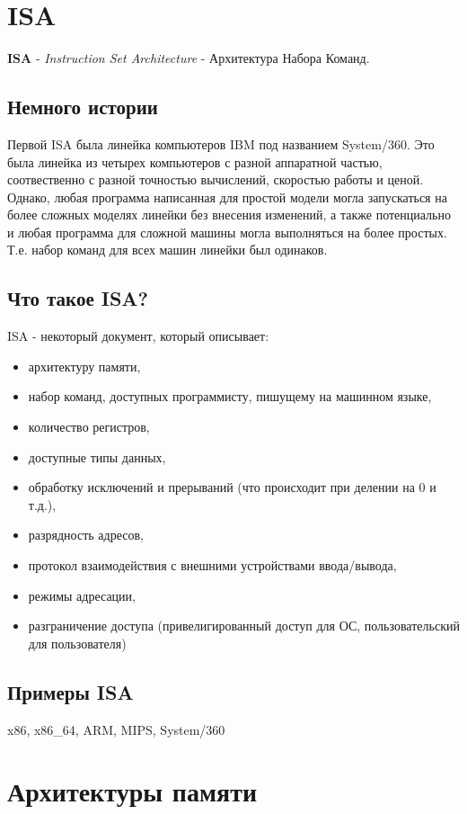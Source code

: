 \documentclass[12pt, a4paper]{article}
\begin{document}
\section{ISA}
\textbf{ISA} - \textit{Instruction Set Architecture} - Архитектура Набора Команд.
\subsection{Немного истории}
Первой ISA была линейка компьютеров IBM под названием System/360. Это была линейка из четырех компьютеров с разной аппаратной частью, соотвественно с разной точностью вычислений, скоростью работы и ценой. Однако, любая программа написанная для простой модели могла запускаться на более сложных моделях линейки без внесения изменений, а также потенциально и любая программа для сложной машины могла выполняться на более простых. Т.е. набор команд для всех машин линейки был одинаков.
\subsection{Что такое ISA?}
ISA - некоторый документ, который описывает:
\begin{itemize}
    \item архитектуру памяти,
    \item набор команд, доступных программисту, пишущему на машинном языке,
    \item количество регистров,
    \item доступные типы данных,
    \item обработку исключений и прерываний (что происходит при делении на 0 и т.д.),
    \item разрядность адресов,
    \item протокол взаимодействия с внешними устройствами ввода/вывода,
    \item режимы адресации,
    \item разграничение доступа (привелигированный доступ для ОС, пользовательский для пользователя)
\end{itemize}
\subsection{Примеры ISA}
x86, x86\_64, ARM, MIPS, System/360 
\section{Архитектуры памяти}
\end{document}
